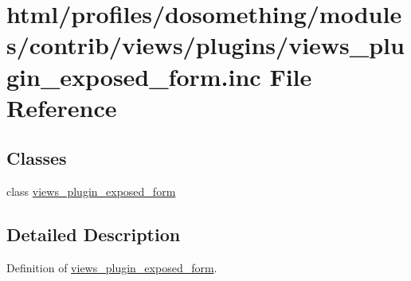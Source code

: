 \hypertarget{views__plugin__exposed__form_8inc}{
\section{html/profiles/dosomething/modules/contrib/views/plugins/views\_\-plugin\_\-exposed\_\-form.inc File Reference}
\label{views__plugin__exposed__form_8inc}
}
\subsection*{Classes}
\begin{DoxyCompactItemize}
\item 
class \hyperlink{classviews__plugin__exposed__form}{views\_\-plugin\_\-exposed\_\-form}
\end{DoxyCompactItemize}


\subsection{Detailed Description}
Definition of \hyperlink{classviews__plugin__exposed__form}{views\_\-plugin\_\-exposed\_\-form}. 